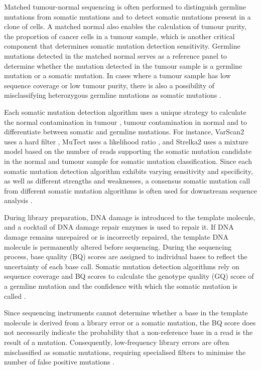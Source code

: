 Matched tumour-normal sequencing is often performed to distinguish germline mutations from somatic mutations and to detect somatic mutations present in a clone of cells. A matched normal also enables the calculation of tumour purity, the proportion of cancer cells in a tumour sample, which is another critical component that determines somatic mutation detection sensitivity. Germline mutations detected in the matched normal serves as a reference panel to determine whether the mutation detected in the tumour sample is a germline mutation or a somatic mutation. In cases where a tumour sample has low sequence coverage or low tumour purity, there is also a possibility of misclassifying heterozygous germline mutations as somatic mutations \cite{Cibulskis2013-gw}.

Each somatic mutation detection algorithm uses a unique strategy to calculate the normal contamination in tumour \cite{Cibulskis2011-tp}, tumour contamination in normal \cite{Taylor-Weiner2018-af} and to differentiate between somatic and germline mutations. For instance, VarScan2 uses a hard filter \cite{Koboldt2012-wd}, MuTect uses a likelihood ratio \cite{Cibulskis2013-gw}, and Strelka2 uses a mixture model \cite{Kim2018-qi} based on the number of reads supporting the somatic mutation candidate in the normal and tumour sample for somatic mutation classification. Since each somatic mutation detection algorithm exhibits varying sensitivity and specificity, as well as different strengths and weaknesses, a consensus somatic mutation call from different somatic mutation algorithms is often used for downstream sequence analysis \cite{Bailey2020-ou}.

During library preparation, DNA damage is introduced to the template molecule, and a cocktail of DNA damage repair enzymes is used to repair it. If DNA damage remains unrepaired or is incorrectly repaired, the template DNA molecule is permanently altered before sequencing. During the sequencing process, base quality (BQ) scores are assigned to individual bases to reflect the uncertainty of each base call. Somatic mutation detection algorithms rely on sequence coverage and BQ scores to calculate the genotype quality (GQ) score of a germline mutation \cite{McKenna2010-br, Li2011-ag} and the confidence with which the somatic mutation is called \cite{Cibulskis2013-gw}. 

Since sequencing instruments cannot determine whether a base in the template molecule is derived from  a library error or a somatic mutation, the BQ score does not necessarily indicate the probability that a non-reference base in a read is the result of a mutation. Consequently, low-frequency library errors are often misclassified as somatic mutations, requiring specialised filters to minimise the number of false positive mutations \cite{Costello2013-cz, Chen2017-ba}.

